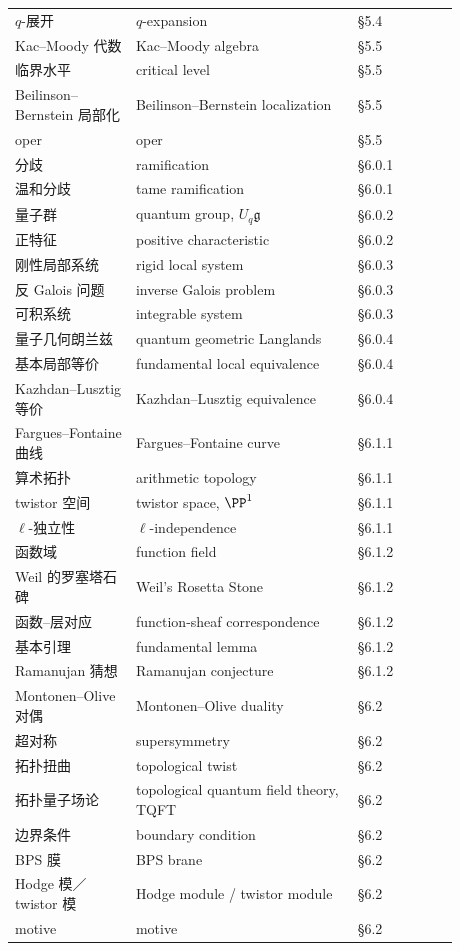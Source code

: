\begin{center}
\begin{longtable}{@{}>{\raggedright\arraybackslash}p{0.24\linewidth}>{\raggedright\arraybackslash}p{0.44\linewidth}>{\raggedright\arraybackslash}p{0.20\linewidth}@{}}
$q$-展开 & $q$-expansion & §5.4 \\
Kac--Moody 代数 & Kac--Moody algebra & §5.5 \\
临界水平 & critical level & §5.5 \\
Beilinson--Bernstein 局部化 & Beilinson--Bernstein localization & §5.5 \\
oper & oper & §5.5 \\
分歧 & ramification & §6.0.1 \\
温和分歧 & tame ramification & §6.0.1 \\
量子群 & quantum group, $U_{q}\mathfrak{g}$ & §6.0.2 \\
正特征 & positive characteristic & §6.0.2 \\
刚性局部系统 & rigid local system & §6.0.3 \\
反 Galois 问题 & inverse Galois problem & §6.0.3 \\
可积系统 & integrable system & §6.0.3 \\
量子几何朗兰兹 & quantum geometric Langlands & §6.0.4 \\
基本局部等价 & fundamental local equivalence & §6.0.4 \\
Kazhdan--Lusztig 等价 & Kazhdan--Lusztig equivalence & §6.0.4 \\
Fargues--Fontaine 曲线 & Fargues--Fontaine curve & §6.1.1 \\
算术拓扑 & arithmetic topology & §6.1.1 \\
twistor 空间 & twistor space, $\PP^{1}$ & §6.1.1 \\
$\ell$-独立性 & $\ell$-independence & §6.1.1 \\
函数域 & function field & §6.1.2 \\
Weil 的罗塞塔石碑 & Weil's Rosetta Stone & §6.1.2 \\
函数--层对应 & function-sheaf correspondence & §6.1.2 \\
基本引理 & fundamental lemma & §6.1.2 \\
Ramanujan 猜想 & Ramanujan conjecture & §6.1.2 \\
Montonen--Olive 对偶 & Montonen--Olive duality & §6.2 \\
超对称 & supersymmetry & §6.2 \\
拓扑扭曲 & topological twist & §6.2 \\
拓扑量子场论 & topological quantum field theory, TQFT & §6.2 \\
边界条件 & boundary condition & §6.2 \\
BPS 膜 & BPS brane & §6.2 \\
Hodge 模／twistor 模 & Hodge module / twistor module & §6.2 \\
motive & motive & §6.2 \\
\end{longtable}
\end{center}

